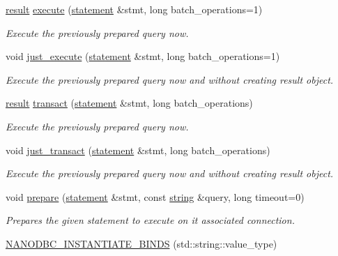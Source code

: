 \begin{DoxyCompactItemize}
\mbox{\hyperlink{classnanodbc_1_1result}{result}} \mbox{\hyperlink{group__mainf_gad178fcf995fa5ac42702607f35e5ba39}{execute}} (\mbox{\hyperlink{classnanodbc_1_1statement}{statement}} \&stmt, long batch\+\_\+operations=1)
\begin{DoxyCompactList}\small\item\em Execute the previously prepared query now. \end{DoxyCompactList}\item 
void \mbox{\hyperlink{group__mainf_gafa9051df00f710f9d4123dc24896d821}{just\+\_\+execute}} (\mbox{\hyperlink{classnanodbc_1_1statement}{statement}} \&stmt, long batch\+\_\+operations=1)
\begin{DoxyCompactList}\small\item\em Execute the previously prepared query now and without creating result object. \end{DoxyCompactList}\item 
\mbox{\hyperlink{classnanodbc_1_1result}{result}} \mbox{\hyperlink{group__mainf_ga3f5b3e15f31690ef54ca20058ea89074}{transact}} (\mbox{\hyperlink{classnanodbc_1_1statement}{statement}} \&stmt, long batch\+\_\+operations)
\begin{DoxyCompactList}\small\item\em Execute the previously prepared query now. \end{DoxyCompactList}\item 
void \mbox{\hyperlink{group__mainf_ga343e69acce5e8122723ca8d38b0a7f92}{just\+\_\+transact}} (\mbox{\hyperlink{classnanodbc_1_1statement}{statement}} \&stmt, long batch\+\_\+operations)
\begin{DoxyCompactList}\small\item\em Execute the previously prepared query now and without creating result object. \end{DoxyCompactList}\item 
void \mbox{\hyperlink{group__mainf_ga961a75629487f22ebc87d114c5699bc2}{prepare}} (\mbox{\hyperlink{classnanodbc_1_1statement}{statement}} \&stmt, const \mbox{\hyperlink{namespacenanodbc_abfc0ece56278e590911ec8352774c212}{string}} \&query, long timeout=0)
\begin{DoxyCompactList}\small\item\em Prepares the given statement to execute on it associated connection. \end{DoxyCompactList}\item 
\mbox{\hyperlink{namespacenanodbc_af1aee669cf097969d60a8b0c7794ca3f}{N\+A\+N\+O\+D\+B\+C\+\_\+\+I\+N\+S\+T\+A\+N\+T\+I\+A\+T\+E\+\_\+\+B\+I\+N\+DS}} (std\+::string\+::value\+\_\+type)

\end{DoxyCompactItemize}

